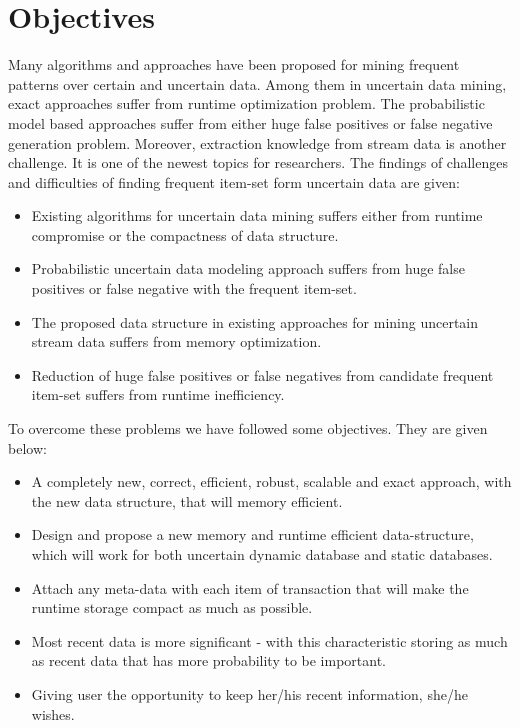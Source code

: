\section{Objectives}
Many algorithms and approaches have been proposed for mining frequent patterns over certain and uncertain data. Among them in uncertain data mining, exact approaches suffer from runtime optimization problem. The probabilistic model based approaches suffer from either huge false positives or false negative generation problem. Moreover, extraction knowledge from stream data is another challenge. It is one of the newest topics for researchers. The findings of challenges and difficulties of finding frequent item-set form uncertain data are given:
\begin{itemize}
    \item Existing algorithms for uncertain data mining suffers either from runtime compromise or the compactness of data structure.
    \item Probabilistic uncertain data modeling approach suffers from huge false positives or false negative with the frequent item-set.
    \item The proposed data structure in existing approaches for mining uncertain stream data suffers from memory optimization.
    \item Reduction of huge false positives or false negatives from candidate frequent item-set suffers from runtime inefficiency.
\end{itemize}
To overcome these problems we have followed some objectives. They are given below:
\begin{itemize}
    \item A completely new, correct, efficient, robust, scalable and exact approach, with the new data structure, that will memory efficient.
    \item Design and propose a new memory and runtime efficient data-structure, which will work for both uncertain dynamic database and static databases.
    \item Attach any meta-data with each item of transaction that will make the runtime storage compact as much as possible.
    \item Most recent data is more significant - with this characteristic storing as much as recent data that has more probability to be important.
   \item Giving user the opportunity to keep her/his recent information, she/he wishes. 
\end{itemize}

